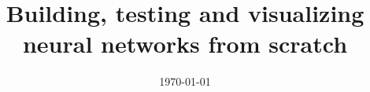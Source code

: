 \documentclass[a4paper, 11pt, oneside]{Thesis}  %
\begin{document}
\frontmatter      %

\title  {Building, testing and visualizing neural networks from scratch}
\addresses  {\groupname\\\deptname\\\univname}  %
\date       {\today}
\subject    {}
\keywords   {}

\maketitle


\fancyhead{}  %
\rhead{\thepage}  %
\lhead{}  %

\pagestyle{fancy}  %
\end{document}

